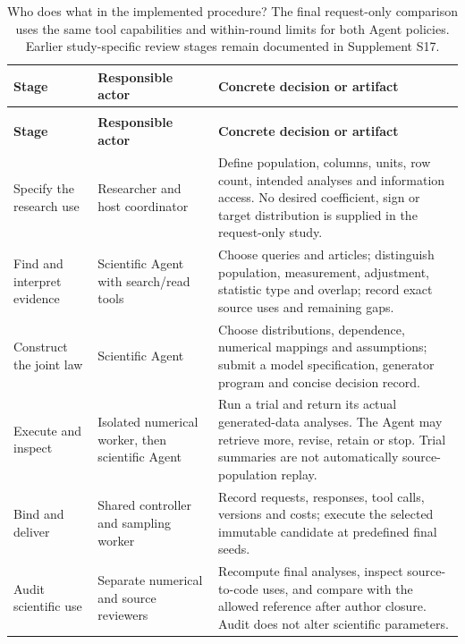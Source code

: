 \documentclass[11pt,letterpaper]{article}
\begin{document}
\begin{xltabular}{\linewidth}{@{}>{\raggedright\arraybackslash}X>{\raggedright\arraybackslash}X>{\raggedright\arraybackslash}X@{}}

\caption{Who does what in the implemented procedure? The final request-only comparison uses the same tool capabilities and within-round limits for both Agent policies. Earlier study-specific review stages remain documented in Supplement S17.}\label{tab:1} \\

\toprule

\textbf{Stage} & \textbf{Responsible actor} & \textbf{Concrete decision or artifact} \\

\midrule

\endfirsthead

\\

\toprule

\textbf{Stage} & \textbf{Responsible actor} & \textbf{Concrete decision or artifact} \\

\midrule

\endhead

\bottomrule

\endfoot

Specify the research use & Researcher and host coordinator & Define population, columns, units, row count, intended analyses and information access. No desired coefficient, sign or target distribution is supplied in the request-only study. \\

Find and interpret evidence & Scientific Agent with search/\allowbreak{}read tools & Choose queries and articles; distinguish population, measurement, adjustment, statistic type and overlap; record exact source uses and remaining gaps. \\

Construct the joint law & Scientific Agent & Choose distributions, dependence, numerical mappings and assumptions; submit a model specification, generator program and concise decision record. \\

Execute and inspect & Isolated numerical worker, then scientific Agent & Run a trial and return its actual generated-data analyses. The Agent may retrieve more, revise, retain or stop. Trial summaries are not automatically source-population replay. \\

Bind and deliver & Shared controller and sampling worker & Record requests, responses, tool calls, versions and costs; execute the selected immutable candidate at predefined final seeds. \\

Audit scientific use & Separate numerical and source reviewers & Recompute final analyses, inspect source-to-code uses, and compare with the allowed reference after author closure. Audit does not alter scientific parameters. \\

\end{xltabular}
\end{document}
